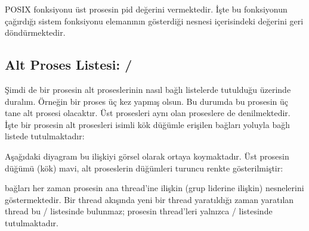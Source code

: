 \documentclass[a4paper,10pt,turkish]{sphinxmanual}
\begin{document}
\sphinxAtStartPar
{} POSIX fonksiyonu üst prosesin pid değerini vermektedir. İşte bu fonksiyonun çağırdığı
 sistem fonksiyonu  elemanının gösterdiği  nesnesi içerisindeki
 değerini geri döndürmektedir.


\subsection{Alt Proses Listesi:  / }
\label{\detokenize{processcontrolblock:alt-proses-listesi-children-sibling}}
\sphinxAtStartPar
Şimdi de bir prosesin alt proseslerinin nasıl bağlı listelerde tutulduğu üzerinde duralım. Örneğin bir
proses üç kez  yapmış olsun. Bu durumda bu prosesin üç tane alt prosesi olacaktır. Üst prosesleri
aynı olan proseslere  de denilmektedir. İşte bir prosesin alt
prosesleri  isimli kök düğümle erişilen  bağları yoluyla bağlı listede
tutulmaktadır:

\begin{sphinxVerbatim}[commandchars=\\\{\}]
\end{sphinxVerbatim}

\sphinxAtStartPar
Aşağıdaki diyagram bu ilişkiyi görsel olarak ortaya koymaktadır. Üst prosesin  düğümü (kök)
mavi, alt proseslerin  düğümleri turuncu renkte gösterilmiştir:


\sphinxAtStartPar
{} bağları her zaman prosesin ana thread’ine ilişkin (grup liderine ilişkin) 
nesnelerini göstermektedir. Bir thread akışında yeni bir thread yaratıldığı zaman yaratılan thread bu
/ listesinde bulunmaz; prosesin thread’leri yalnızca /
listesinde tutulmaktadır.
\end{document}
